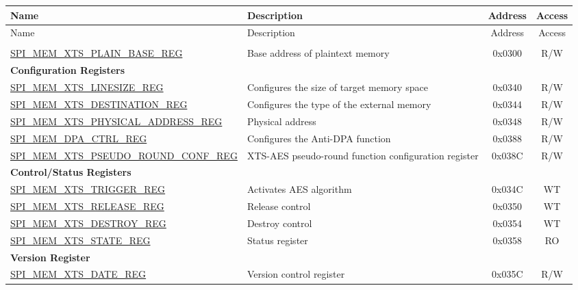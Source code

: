 \begin{longtable}{ | p{6.0cm} | p{6.6cm} | c | c| }
\hline\rowcolor{lightgray}
Name & Description & Address & Access \\ \hline
\endfirsthead
\hline
\rowcolor{lightgray}
Name & Description & Address & Access  \\
\hline
\endhead
\endfoot

\multicolumn{4}{|l|}{\textbf{Plaintext Register Heap}} \\\hline
\hyperref[regdesc:SPIMEMXTSPLAINBASEREG]{SPI\_MEM\_XTS\_PLAIN\_BASE\_REG}  & Base address of plaintext memory   & 0x0300 & R/W \\\hline
\multicolumn{4}{|l|}{\textbf{Configuration Registers}} \\ \hline
\hyperref[regdesc:SPIMEMXTSLINESIZEREG]{SPI\_MEM\_XTS\_LINESIZE\_REG}  & Configures the size of target memory space & 0x0340 & R/W \\\hline
\hyperref[regdesc:SPIMEMXTSDESTINATIONREG]{SPI\_MEM\_XTS\_DESTINATION\_REG}  & Configures the type of the external memory   & 0x0344 & R/W \\\hline
\hyperref[regdesc:SPIMEMXTSPHYSICALADDRESSREG]{SPI\_MEM\_XTS\_PHYSICAL\_ADDRESS\_REG}  & Physical address   & 0x0348 & R/W \\\hline
\hyperref[regdesc:SPIMEMDPACTRLREG]{SPI\_MEM\_DPA\_CTRL\_REG}  & Configures the Anti-DPA function       & 0x0388 & R/W \\\hline
\hyperref[regdesc:SPIMEMXTSPSEUDOROUNDCONFREG]{SPI\_MEM\_XTS\_PSEUDO\_ROUND\_CONF\_REG} & XTS-AES pseudo-round function configuration register & 0x038C & R/W \\ \hline
\multicolumn{4}{|l|}{\textbf{Control/Status Registers}} \\ \hline
\hyperref[regdesc:SPIMEMXTSTRIGGERREG]{SPI\_MEM\_XTS\_TRIGGER\_REG}  & Activates AES algorithm         & 0x034C & WT \\\hline
\hyperref[regdesc:SPIMEMXTSRELEASEREG]{SPI\_MEM\_XTS\_RELEASE\_REG}  & Release control         & 0x0350 & WT \\\hline
\hyperref[regdesc:SPIMEMXTSDESTROYREG]{SPI\_MEM\_XTS\_DESTROY\_REG}  & Destroy control         & 0x0354 & WT \\\hline
\hyperref[regdesc:SPIMEMXTSSTATEREG]{SPI\_MEM\_XTS\_STATE\_REG}  & Status register       & 0x0358 & RO \\\hline
\multicolumn{4}{|l|}{\textbf{Version Register}} \\ \hline
\hyperref[regdesc:SPIMEMXTSDATEREG]{SPI\_MEM\_XTS\_DATE\_REG}  & Version control register   & 0x035C & R/W \\\hline

\end{longtable}
